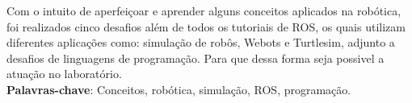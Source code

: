 \begin{thesisresumo}
Com o intuito de aperfeiçoar e aprender alguns conceitos aplicados na robótica, foi realizados cinco desafios além de todos os tutoriais
de ROS, os quais utilizam diferentes aplicações como: simulação de robôs, Webots e Turtlesim, adjunto a desafios de linguagens de programação. Para que
dessa forma seja possivel a atuação no laboratório.
\ \\



\textbf{Palavras-chave}: Conceitos, robótica, simulação, ROS, programação.

\end{thesisresumo}
